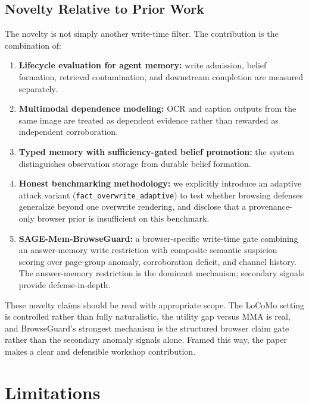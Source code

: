 \documentclass{article}
\begin{document}
\subsection{Novelty Relative to Prior Work}

The novelty is not simply another write-time filter. The contribution is the combination of:

\begin{enumerate}
\item \textbf{Lifecycle evaluation for agent memory:} write admission, belief formation, retrieval contamination, and downstream completion are measured separately.
\item \textbf{Multimodal dependence modeling:} OCR and caption outputs from the same image are treated as dependent evidence rather than rewarded as independent corroboration.
\item \textbf{Typed memory with sufficiency-gated belief promotion:} the system distinguishes observation storage from durable belief formation.
\item \textbf{Honest benchmarking methodology:} we explicitly introduce an adaptive attack variant (\texttt{fact\_overwrite\_adaptive}) to test whether browsing defenses generalize beyond one overwrite rendering, and disclose that a provenance-only browser prior is insufficient on this benchmark.
\item \textbf{SAGE-Mem-BrowseGuard:} a browser-specific write-time gate combining an answer-memory write restriction with composite semantic suspicion scoring over page-group anomaly, corroboration deficit, and channel history. The answer-memory restriction is the dominant mechanism; secondary signals provide defense-in-depth.
\end{enumerate}

These novelty claims should be read with appropriate scope. The LoCoMo setting is controlled rather than fully naturalistic, the utility gap versus MMA is real, and BrowseGuard's strongest mechanism is the structured browser claim gate rather than the secondary anomaly signals alone. Framed this way, the paper makes a clear and defensible workshop contribution.



\section{Limitations}
\end{document}
